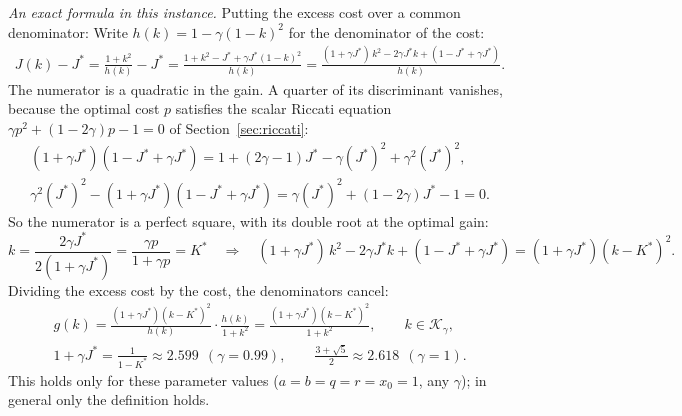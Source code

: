 \documentclass[11pt]{article}
\begin{document}
\emph{An exact formula in this instance.} Putting the excess cost over a common denominator:
Write $h(k) = 1 - \gamma(1 - k)^2$ for the denominator of the cost:
\begin{gather*}
  J(k) - J^* = \frac{1 + k^2}{h(k)} - J^* = \frac{1 + k^2 - J^* + \gamma J^* (1 - k)^2}{h(k)}
  = \frac{(1 + \gamma J^*)\, k^2 - 2\gamma J^* k + (1 - J^* + \gamma J^*)}{h(k)} .
\end{gather*}
The numerator is a quadratic in the gain. A quarter of its discriminant vanishes, because the optimal
cost $p$ satisfies the scalar Riccati equation $\gamma p^2 + (1 - 2\gamma)p - 1 = 0$ of
Section~\ref{sec:riccati}:
\begin{gather*}
  (1 + \gamma J^*)(1 - J^* + \gamma J^*) = 1 + (2\gamma - 1) J^* - \gamma (J^*)^2 + \gamma^2 (J^*)^2, \\
  \gamma^2 (J^*)^2 - (1 + \gamma J^*)(1 - J^* + \gamma J^*)
  = \gamma (J^*)^2 + (1 - 2\gamma) J^* - 1 = 0 .
\end{gather*}
So the numerator is a perfect square, with its double root at the optimal gain:
\[
  k = \frac{2\gamma J^*}{2(1 + \gamma J^*)} = \frac{\gamma p}{1 + \gamma p} = K^*
  \quad\Longrightarrow\quad
  (1 + \gamma J^*)\, k^2 - 2\gamma J^* k + (1 - J^* + \gamma J^*) = (1 + \gamma J^*)(k - K^*)^2 .
\]
Dividing the excess cost by the cost, the denominators cancel:
\begin{gather*}
  g(k) = \frac{(1 + \gamma J^*)(k - K^*)^2}{h(k)} \cdot \frac{h(k)}{1 + k^2}
  = \frac{(1 + \gamma J^*)(k - K^*)^2}{1 + k^2}, \qquad k \in \mathcal{K}_\gamma, \\
  1 + \gamma J^* = \frac{1}{1 - K^*} \approx 2.599 \ \ (\gamma = 0.99), \qquad
  \frac{3 + \sqrt{5}}{2} \approx 2.618 \ \ (\gamma = 1) .
\end{gather*}
This holds only for these parameter values ($a = b = q = r = x_0 = 1$, any $\gamma$); in general only
the definition holds.
\end{document}
